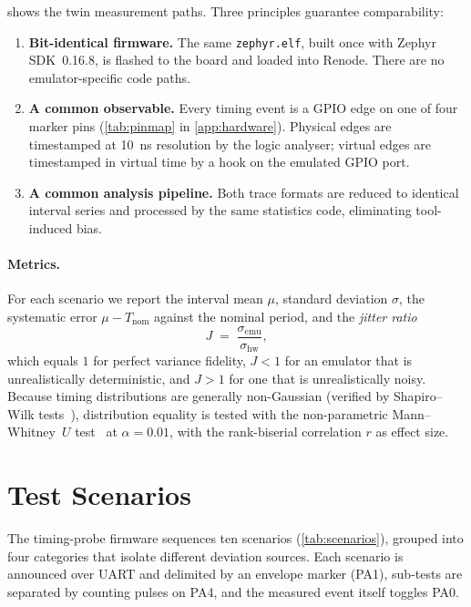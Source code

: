  shows the twin measurement paths. Three principles
guarantee comparability:

\begin{enumerate}
  \item \textbf{Bit-identical firmware.} The same
        \texttt{zephyr.elf}, built once with Zephyr SDK~0.16.8, is
        flashed to the board and loaded into Renode. There are no
        emulator-specific code paths.
  \item \textbf{A common observable.} Every timing event is a GPIO edge
        on one of four marker pins (\cref{tab:pinmap} in
        \cref{app:hardware}). Physical edges are timestamped at
        \SI{10}{\nano\second} resolution by the logic analyser; virtual
        edges are timestamped in virtual time by a hook on the emulated
        GPIO port.
  \item \textbf{A common analysis pipeline.} Both trace formats are
        reduced to identical interval series and processed by the same
        statistics code, eliminating tool-induced bias.
\end{enumerate}

\paragraph{Metrics.} For each scenario we report the interval mean
$\mu$, standard deviation $\sigma$, the systematic error
$\mu - T_{\mathrm{nom}}$ against the nominal period, and the
\emph{jitter ratio}
\begin{equation}
  J \;=\; \frac{\sigma_{\mathrm{emu}}}{\sigma_{\mathrm{hw}}},
  \label{eq:jitterratio}
\end{equation}
which equals $1$ for perfect variance fidelity, $J<1$ for an emulator
that is unrealistically deterministic, and $J>1$ for one that is
unrealistically noisy. Because timing distributions are generally
non-Gaussian (verified by Shapiro--Wilk tests~\cite{shapiro1965}),
distribution equality is tested with the non-parametric
Mann--Whitney~$U$ test~\cite{mann1947} at $\alpha=0.01$, with the
rank-biserial correlation $r$ as effect size.

\section{Test Scenarios}
\label{sec:problem:scenarios}

The timing-probe firmware sequences ten scenarios
(\cref{tab:scenarios}), grouped into four categories that isolate
different deviation sources. Each scenario is announced over UART and
delimited by an envelope marker (PA1), sub-tests are separated by
counting pulses on PA4, and the measured event itself toggles PA0.

